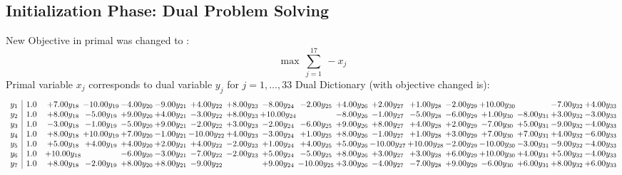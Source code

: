 \documentclass[9pt]{article}
\begin{document}
\subsection{Initialization Phase: Dual Problem Solving}
New Objective in primal was changed to : \[ \max\ \sum_{j=1}^{17}\ - x_j \] 
Primal variable $x_j$ corresponds to dual variable $y_j$ for $j = 1,\ldots,33$
Dual Dictionary (with objective changed is): 
\[\begin{array}{c| c c@{\hskip 2pt} c@{\hskip 2pt} c@{\hskip 2pt} c@{\hskip 2pt} c@{\hskip 2pt} c@{\hskip 2pt} c@{\hskip 2pt} c@{\hskip 2pt} c@{\hskip 2pt} c@{\hskip 2pt} c@{\hskip 2pt} c@{\hskip 2pt} c@{\hskip 2pt} c@{\hskip 2pt} c@{\hskip 2pt} c@{\hskip 2pt} }
 y_{1}   &  1.0 & +  7.00 y_{18} & -10.00 y_{19} & -4.00 y_{20} & -9.00 y_{21} & +  4.00 y_{22} & +  8.00 y_{23} & -8.00 y_{24} & -2.00 y_{25} & +  4.00 y_{26} & +  2.00 y_{27} & +  1.00 y_{28} & -2.00 y_{29} & + 10.00 y_{30} &   & -7.00 y_{32} & +  4.00 y_{33}\\
 y_{2}   &  1.0 & +  8.00 y_{18} & -5.00 y_{19} & +  9.00 y_{20} & +  4.00 y_{21} & -3.00 y_{22} & +  8.00 y_{23} & + 10.00 y_{24} &   & -8.00 y_{26} & -1.00 y_{27} & -5.00 y_{28} & -6.00 y_{29} & +  1.00 y_{30} & -8.00 y_{31} & +  3.00 y_{32} & -3.00 y_{33}\\
 y_{3}   &  1.0 & -3.00 y_{18} & -1.00 y_{19} & -5.00 y_{20} & +  9.00 y_{21} & -2.00 y_{22} & +  3.00 y_{23} & -2.00 y_{24} & -6.00 y_{25} & +  9.00 y_{26} & +  8.00 y_{27} & +  4.00 y_{28} & +  2.00 y_{29} & -7.00 y_{30} & +  5.00 y_{31} & -9.00 y_{32} & -4.00 y_{33}\\
 y_{4}   &  1.0 & +  8.00 y_{18} & + 10.00 y_{19} & +  7.00 y_{20} & -1.00 y_{21} & -10.00 y_{22} & +  4.00 y_{23} & -3.00 y_{24} & +  1.00 y_{25} & +  8.00 y_{26} & -1.00 y_{27} & +  1.00 y_{28} & +  3.00 y_{29} & +  7.00 y_{30} & +  7.00 y_{31} & +  4.00 y_{32} & -6.00 y_{33}\\
 y_{5}   &  1.0 & +  5.00 y_{18} & +  4.00 y_{19} & +  4.00 y_{20} & +  2.00 y_{21} & +  4.00 y_{22} & -2.00 y_{23} & +  1.00 y_{24} & +  4.00 y_{25} & +  5.00 y_{26} & -10.00 y_{27} & + 10.00 y_{28} & -2.00 y_{29} & -10.00 y_{30} & -3.00 y_{31} & -9.00 y_{32} & -4.00 y_{33}\\
 y_{6}   &  1.0 & + 10.00 y_{18} &   & -6.00 y_{20} & -3.00 y_{21} & -7.00 y_{22} & -2.00 y_{23} & +  5.00 y_{24} & -5.00 y_{25} & +  8.00 y_{26} & +  3.00 y_{27} & +  3.00 y_{28} & +  6.00 y_{29} & + 10.00 y_{30} & +  4.00 y_{31} & +  5.00 y_{32} & -4.00 y_{33}\\
 y_{7}   &  1.0 & +  8.00 y_{18} & -2.00 y_{19} & +  8.00 y_{20} & +  8.00 y_{21} & -9.00 y_{22} &   & +  9.00 y_{24} & -10.00 y_{25} & +  3.00 y_{26} & -4.00 y_{27} & -7.00 y_{28} & +  9.00 y_{29} & -6.00 y_{30} & +  6.00 y_{31} & +  8.00 y_{32} & +  6.00 y_{33}\\

\end{array}\]
\end{document}
